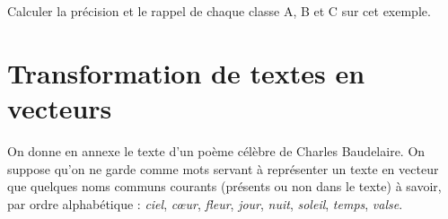 \documentclass[a4paper, 11pt]{article}
\begin{document}
\begin{enumerate}
\begin{center}
        \end{center}

        Calculer la précision et le rappel de chaque classe A, B et C sur cet exemple.
\end{enumerate}

\section{Transformation de textes en vecteurs}
On donne en annexe le texte d'un poème célèbre de Charles Baudelaire.
On suppose qu'on ne garde comme mots servant à représenter un texte en vecteur que quelques noms
communs courants (présents ou non dans le texte) à savoir, par ordre alphabétique : \emph{ciel},
\emph{cœur}, \emph{fleur}, \emph{jour}, \emph{nuit}, \emph{soleil}, \emph{temps}, \emph{valse}.
\end{document}

